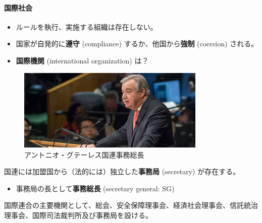 \documentclass[
  xelatex,
  ja=standard]{bxjsarticle}
\let\oldparagraph\paragraph
\renewcommand{\paragraph}[1]{\oldparagraph{#1}\mbox{}}
\providecommand{\tightlist}{%
  \setlength{\itemsep}{0pt}\setlength{\parskip}{0pt}}\usepackage{longtable,booktabs,array}
\begin{document}
\hypertarget{ux56fdux969bux793eux4f1a-1}{%
\paragraph{国際社会}\label{ux56fdux969bux793eux4f1a-1}}

\begin{itemize}
\tightlist
\item
  ルールを執行、実施する組織は存在しない。
\item
  国家が自発的に\textbf{遵守} (compliance) するか、他国から\textbf{強制}
  (coersion) される。
\item
  \textbf{国際機関} (international organization) は？
\end{itemize}

\begin{figure}[htpb]

{\centering \includegraphics[width=0.8\textwidth,height=\textheight]{international_society_files/mediabag/707593-guterres-sg.jpg}

}

\caption{アントニオ・グテーレス国連事務総長}

\end{figure}

国連には加盟国から（法的には）独立した\textbf{事務局} (secretary)
が存在する。

\begin{itemize}
\tightlist
\item
  事務局の長として\textbf{事務総長} (secretary general: SG)
\end{itemize}

\begin{tcolorbox}[enhanced jigsaw, titlerule=0mm, colback=white, coltitle=black, title=\textcolor{quarto-callout-note-color}{\faInfo}\hspace{0.5em}{\href{https://www.unic.or.jp/info/un/charter/text_japanese/}{国連憲章}　第7条1項}, leftrule=.75mm, bottomrule=.15mm, left=2mm, arc=.35mm, breakable, colbacktitle=quarto-callout-note-color!10!white, toprule=.15mm, rightrule=.15mm, opacityback=0, bottomtitle=1mm, colframe=quarto-callout-note-color-frame, toptitle=1mm, opacitybacktitle=0.6]

国際連合の主要機関として、総会、安全保障理事会、経済社会理事会、信託統治理事会、国際司法裁判所及び事務局を設ける。

\end{tcolorbox}
\end{document}
